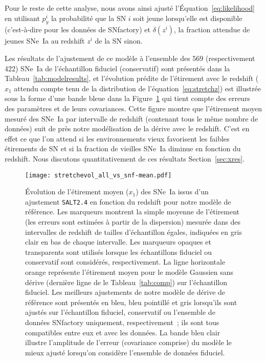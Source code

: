 \documentclass[../main/main.tex]{subfiles}
\begin{document}
Pour le reste de cette analyse, nous avons ainsi ajusté
l'Équation~\ref{eq:likelihood} en utilisant $p_y^i$ la probabilité que la SN $i$
soit jeune lorsqu'elle est disponible (c'est-à-dire pour les données de
SNfactory) et $\delta(z^i)$, la fraction attendue de jeunes SNe~Ia au redshift
$z^i$ de la SN sinon.\bigbreak

Les résultats de l'ajustement de ce modèle à l'ensemble des 569 (respectivement
422) SNe~Ia de l'échantillon fiduciel (conservatif) sont présentés dans la
Tableau~\ref{tab:modelresults}, et l'évolution prédite de l'étirement avec le
redshift ($x_1$ attendu compte tenu de la distribution de
l'équation~\ref{eq:stretchz}) est illustrée sous la forme d'une bande bleue dans
la Figure~\ref{fig:modelall} qui tient compte des erreurs des paramètres et de
leurs covariances. Cette figure montre que l'étirement moyen mesuré des SNe~Ia
par intervalle de redshift (contenant tous le même nombre de données) suit de
près notre modélisation de la dérive avec le redshift. C'est en effet ce que
l'on attend si les environnements vieux favorisent les faibles étirements de SN
\citep[voir par exemple][]{howell2007} et si la fraction de vieilles SNe~Ia
diminue en fonction du redshift. Nous discutons quantitativement de ces
résultats Section~\ref{sec:xres}.

\begin{figure}
    \centering
    \texttt{[image: stretchevol\_all\_vs\_snf-mean.pdf]}
    \caption[Évolution de l'étirement moyen des SNe~Ia en fonction du redshift
    issu de la prédiction de notre modèle de référence selon l'échantillon
    utilisé.]{Évolution de l'étirement moyen ($x_1$) des SNe~Ia issus d'un
        ajustement \texttt{SALT2.4} en fonction du redshift pour notre modèle de
        référence. Les marqueurs montrent la simple moyenne de l'étirement (les
        erreurs sont estimées à partir de la dispersion) mesurée dans des
        intervalles de redshift de tailles d'échantillon égales, indiquées en
        gris clair en bas de chaque intervalle. Les marqueurs opaques et
        transparents sont utilisés lorsque les échantillons fiduciel ou
        conservatif sont considérés, respectivement. La ligne horizontale orange
        représente l'étirement moyen pour le modèle Gaussien sans dérive
        (dernière ligne de le Tableau~\ref{tab:comp}) sur l'échantillon fiduciel.
        Les meilleurs ajustements de notre modèle de dérive de référence sont
        présentés en bleu, bleu pointillé et gris lorsqu'ils sont ajustés sur
        l'échantillon fiduciel, conservatif ou l'ensemble de données SNfactory
        uniquement, respectivement~; ils sont tous compatibles entre eux et avec
        les données. La bande bleu clair illustre l'amplitude de l'erreur
        (covariance comprise) du modèle le mieux ajusté lorsqu'on considère
    l'ensemble de données fiduciel.}
    \label{fig:modelall}
\end{figure}
\end{document}

